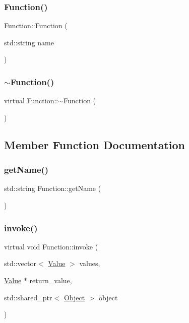 \subsubsection{\texorpdfstring{Function()}{Function()}}
{\footnotesize\ttfamily Function\+::\+Function (\begin{DoxyParamCaption}\item[{std\+::string}]{name }\end{DoxyParamCaption})}

\mbox{\label{classFunction_a8697b2e490a4314a7ccbb17aea8ce537}} 
\subsubsection{\texorpdfstring{$\sim$\+Function()}{~Function()}}
{\footnotesize\ttfamily virtual Function\+::$\sim$\+Function (\begin{DoxyParamCaption}{ }\end{DoxyParamCaption})\hspace{0.3cm}{\ttfamily [virtual]}}



\subsection{Member Function Documentation}
\mbox{\label{classFunction_a5b7d859d767e8a9c19fc5b81a0d10395}} 
\subsubsection{\texorpdfstring{get\+Name()}{getName()}}
{\footnotesize\ttfamily std\+::string Function\+::get\+Name (\begin{DoxyParamCaption}{ }\end{DoxyParamCaption})}

\mbox{\label{classFunction_a84f9a63e68becc27e58ea738ba4cd698}} 
\subsubsection{\texorpdfstring{invoke()}{invoke()}}
{\footnotesize\ttfamily virtual void Function\+::invoke (\begin{DoxyParamCaption}\item[{std\+::vector$<$ \hyperlink{classValue}{Value} $>$}]{values,  }\item[{\hyperlink{classValue}{Value} $\ast$}]{return\+\_\+value,  }\item[{std\+::shared\+\_\+ptr$<$ \hyperlink{classObject}{Object} $>$}]{object }\end{DoxyParamCaption})\hspace{0.3cm}{\ttfamily [pure virtual]}}



